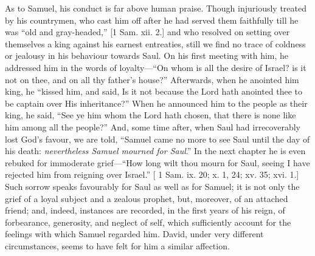 As to Samuel, his conduct is far above human praise. Though
injuriously treated by his countrymen, who cast him off after he had
served them faithfully till he was ``old and gray-headed,'' [1
Sam. xii. 2.] and who resolved on setting over themselves a king
against his earnest entreaties, still we find no trace of coldness or
jealousy in his behaviour towards Saul. On his first meeting with him,
he addressed him in the words of loyalty—``On whom is all the
desire of Israel? is it not on thee, and on all thy father's
house?'' Afterwards, when he anointed him king, he ``kissed
him, and said, Is it not because the Lord hath anointed thee to be
captain over His inheritance?'' When he announced him to the
people as their king, he said, ``See ye him whom the Lord hath
chosen, that there is none like him among all the people?'' And,
some time after, when Saul had irrecoverably lost God's favour, we
are told, ``Samuel came no more to see Saul until the day of his
death: \emph{nevertheless Samuel mourned for Saul}.'' In the next
chapter he is even rebuked for immoderate grief—``How long wilt
thou mourn for Saul, seeing I have rejected him from reigning over
Israel.'' [ 1 Sam. ix. 20; x. 1, 24; xv. 35; xvi. 1.] Such sorrow
speaks favourably for Saul as well as for Samuel; it is not only the
grief of a loyal subject and a zealous prophet, but, moreover, of an
attached friend; and, indeed, instances are recorded, in the first
years of his reign, of forbearance, generosity, and neglect of self,
which sufficiently account for the feelings with which Samuel regarded
him. David, under very different circumstances, seems to have felt for
him a similar affection.

